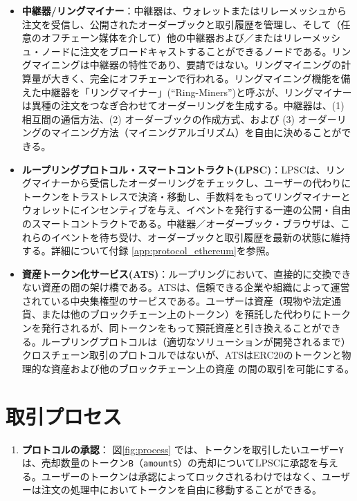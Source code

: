 \documentclass{article}
\begin{document}
\begin{multicols}{2}
\begin{itemize}
\item \textbf{中継器/リングマイナー}：中継器は、ウォレットまたはリレーメッシュから注文を受信し、公開されたオーダーブックと取引履歴を管理し、そして（任意のオフチェーン媒体を介して）他の中継器および／またはリレーメッシュ・ノードに注文をブロードキャストすることができるノードである。リングマイニングは中継器の特性であり、要請ではない。リングマイニングの計算量が大きく、完全にオフチェーンで行われる。リングマイニング機能を備えた中継器を「リングマイナー」(\enquote{Ring-Miners})と呼ぶが、リングマイナーは異種の注文をつなぎ合わせてオーダーリングを生成する。中継器は、(1) 相互間の通信方法、(2) オーダーブックの作成方式、および (3) オーダーリングのマイニング方法（マイニングアルゴリズム）を自由に決めることができる。

\item \textbf{ループリングプロトコル・スマートコントラクト(LPSC)}：LPSCは、リングマイナーから受信したオーダーリングをチェックし、ユーザーの代わりにトークンをトラストレスで決済・移動し、手数料をもってリングマイナーとウォレットにインセンティブを与え、イベントを発行する一連の公開・自由のスマートコントラクトである。中継器／オーダーブック・ブラウザは、これらのイベントを待ち受け、オーダーブックと取引履歴を最新の状態に維持する。詳細について付録 \ref{app:protocol_ethereum}を参照。

\item \textbf{資産トークン化サービス(ATS)}：ループリングにおいて、直接的に交換できない資産の間の架け橋である。ATSは、信頼できる企業や組織によって運営されている中央集権型のサービスである。ユーザーは資産（現物や法定通貨、または他のブロックチェーン上のトークン）を預託した代わりにトークンを発行されるが、同トークンをもって預託資産と引き換えることができる。ループリングプロトコルは（適切なソリューションが開発されるまで）クロスチェーン取引のプロトコルではないが、ATSはERC20のトークンと物理的な資産および他のブロックチェーン上の資産\cite{ERC20} の間の取引を可能にする。

\end{itemize}


\section{取引プロセス\label{sec:process}}



\begin{enumerate} 


\item \textbf{プロトコルの承認}： 図\ref{fig:process} では、トークンを取引したいユーザー\verb|Y|は、売却数量のトークン\verb|B|（\verb|amountS|）の売却についてLPSCに承認を与える。ユーザーのトークンは承認によってロックされるわけではなく、ユーザーは注文の処理中においてトークンを自由に移動することができる。


\end{enumerate}
\end{multicols}
\end{document}
